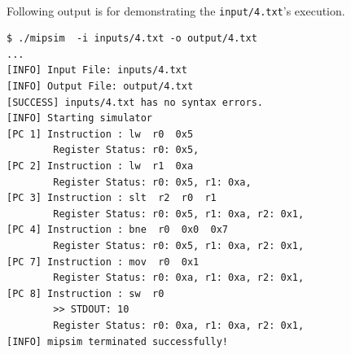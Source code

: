 \documentclass{homework}
\begin{document}
\\
Following output is for demonstrating the \texttt{input/4.txt}'s execution. 
\\
\begin{center}
\begin{code}
\begin{verbatim}
$ ./mipsim  -i inputs/4.txt -o output/4.txt
...
[INFO] Input File: inputs/4.txt
[INFO] Output File: output/4.txt
[SUCCESS] inputs/4.txt has no syntax errors.
[INFO] Starting simulator
[PC 1] Instruction : lw  r0  0x5
        Register Status: r0: 0x5,
[PC 2] Instruction : lw  r1  0xa
        Register Status: r0: 0x5, r1: 0xa,
[PC 3] Instruction : slt  r2  r0  r1
        Register Status: r0: 0x5, r1: 0xa, r2: 0x1,
[PC 4] Instruction : bne  r0  0x0  0x7
        Register Status: r0: 0x5, r1: 0xa, r2: 0x1,
[PC 7] Instruction : mov  r0  0x1
        Register Status: r0: 0xa, r1: 0xa, r2: 0x1,
[PC 8] Instruction : sw  r0
        >> STDOUT: 10
        Register Status: r0: 0xa, r1: 0xa, r2: 0x1,
[INFO] mipsim terminated successfully!
\end{verbatim}
\end{code}
\end{center}
\\
\end{document}
